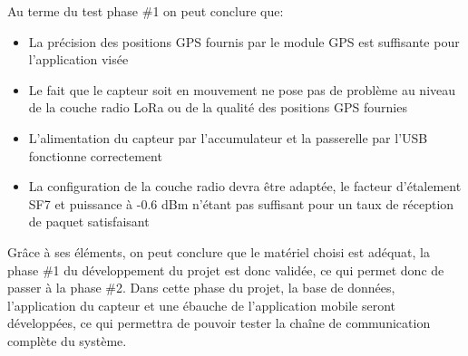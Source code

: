 Au terme du test phase \#1 on peut conclure que:

\begin{itemize}
\item La précision des positions GPS fournis par le module GPS est suffisante pour l'application visée
\item Le fait que le capteur soit en mouvement ne pose pas de problème au niveau de la couche radio LoRa ou de la qualité des positions GPS fournies
\item L'alimentation du capteur par l'accumulateur et la passerelle par l'USB fonctionne correctement
\item La configuration de la couche radio devra être adaptée, le facteur d'étalement SF7 et puissance à -0.6 dBm n'étant pas suffisant pour un taux de réception de paquet satisfaisant
\end{itemize}

Grâce à ses éléments, on peut conclure que le matériel choisi est adéquat, la phase \#1 du développement du projet est donc validée, ce qui permet donc de passer à la phase \#2. Dans cette phase du projet, la base de données, l'application du capteur et une ébauche de l'application mobile seront développées, ce qui permettra de pouvoir tester la chaîne de communication complète du système.





